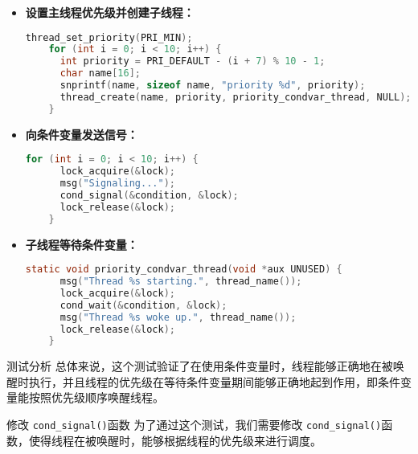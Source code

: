 \documentclass{beamer}
\begin{document}
\begin{frame}
\begin{itemize}
    \item \textbf{设置主线程优先级并创建子线程：}
          \begin{lstlisting}[language=C]
    thread_set_priority(PRI_MIN);
    for (int i = 0; i < 10; i++) {
      int priority = PRI_DEFAULT - (i + 7) % 10 - 1;
      char name[16];
      snprintf(name, sizeof name, "priority %d", priority);
      thread_create(name, priority, priority_condvar_thread, NULL);
    }
\end{lstlisting}

    \item \textbf{向条件变量发送信号：}
          \begin{lstlisting}[language=C]
    for (int i = 0; i < 10; i++) {
      lock_acquire(&lock);
      msg("Signaling...");
      cond_signal(&condition, &lock);
      lock_release(&lock);
    }
\end{lstlisting}

    \item \textbf{子线程等待条件变量：}
          \begin{lstlisting}[language=C]
    static void priority_condvar_thread(void *aux UNUSED) {
      msg("Thread %s starting.", thread_name());
      lock_acquire(&lock);
      cond_wait(&condition, &lock);
      msg("Thread %s woke up.", thread_name());
      lock_release(&lock);
    }
\end{lstlisting}
  \end{itemize}

  \framebreak

  \begin{block}{测试分析}
    总体来说，这个测试验证了在使用条件变量时，线程能够正确地在被唤醒时执行，并且线程的优先级在等待条件变量期间能够正确地起到作用，即条件变量能按照优先级顺序唤醒线程。
  \end{block}

  \framebreak

  \begin{block}{修改 \texttt{cond\_signal()}函数}
    为了通过这个测试，我们需要修改 \texttt{cond\_signal()}函数，使得线程在被唤醒时，能够根据线程的优先级来进行调度。
  \end{block}

  

\end{frame}
\end{document}

